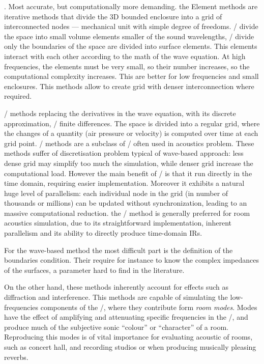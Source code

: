 .
Most accurate, but computationally more demanding.
the Element methods are iterative methods that divide the 3D bounded enclosure into a grid of interconnected nodes --- mechanical unit with simple degree of freedoms.
\FEMf/ divide the space into small volume elements smaller of the sound wavelengths,
\BEMf/ divide only the boundaries of the space are divided into surface elements.
This elements interact with each other according to the math of the wave equation.
At high frequencies, the elements must be very small, so their number increases, so the computational complexity increases.
This are better for low frequencies and small enclosures.
This methods allow to create grid with denser interconnection where required.

\FDTDf/ methods replacing the derivatives in the wave equation, with its discrete approximation, \ie/ finite differences.
The space is divided into a regular grid, where the changes of a quantity (air pressure or velocity) is computed over time at each grid point.
\DWMf/ methods are a subclass of \FDTD/ often used in acoustics problem.
These methods suffer of discretisation problem typical of wave-based approach:
less dense grid may simplify too much the simulation, while denser grid increase the computational load.
However the main benefit of \FDTD/ is that it run directly in the time domain, requiring easier implementation.
Moreover it exhibits a natural huge level of parallelism: each individual node in the grid (in number of thousands or millions) can be updated without synchronization, leading to an massive computational reduction.
the \FDTD/ method is generally preferred for room acoustics simulation\cite{Valimaki2012fifty},
due to its straightforward implementation, inherent parallelism and its ability to directly produce time-domain IRs.

For the wave-based method the most difficult part is the definition of the boundaries condition.
Their require for instance to know the complex impedances of the surfaces, a parameter hard to find in the literature.

On the other hand, these methods inherently account for effects such as diffraction and interference.
This methods are capable of simulating the low-frequencies components of the \RIR/, where they contribute form \textit{room modes}.
Modes have the effect of amplifying and attenuating specific frequencies in the \RIR/, and produce much of the subjective sonic “colour” or “character” of a room.
Reproducing this modes is of vital importance for evaluating acoustic of rooms, such as concert hall, and recording studios or when producing musically pleasing reverbs.


